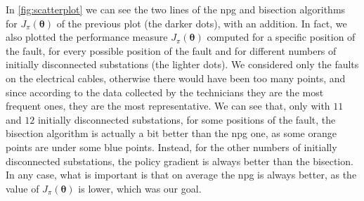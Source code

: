 
In \autoref{fig:scatterplot} we can see the two lines of the \acrshort{npg} and bisection algorithms for $J_\pi(\boldsymbol \theta)$ of the previous plot (the darker dots), with an addition. In fact, we also plotted the performance measure $J_\pi(\boldsymbol \theta)$ computed for a specific position of the fault, for every possible position of the fault and for different numbers of initially disconnected substations (the lighter dots). We considered only the faults on the electrical cables, otherwise there would have been too many points, and since according to the data collected by the technicians they are the most frequent ones, they are the most representative. We can see that, only with $11$ and $12$ initially disconnected substations, for some positions of the fault, the bisection algorithm is actually a bit better than the \acrshort{npg} one, as some orange points are under some blue points. Instead, for the other numbers of initially disconnected substations, the policy gradient is always better than the bisection. In any case, what is important is that on average the \acrshort{npg} is always better, as the value of $J_\pi(\boldsymbol \theta)$ is lower, which was our goal.

